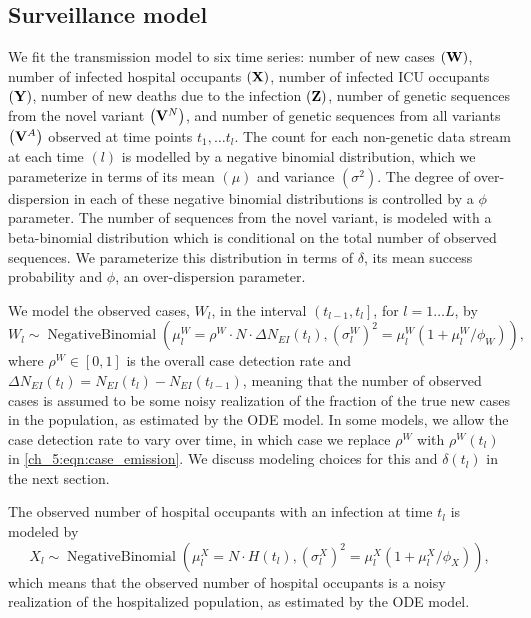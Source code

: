 \subsection{Surveillance model}
\label{ch_5:subsec:surveillance}

We fit the transmission model to six time series: number of new cases \( \left( \mathbf{W} \right) \),  number of infected hospital occupants \( \left( \mathbf{X} \right) \), number of infected ICU occupants \( \left( \mathbf{Y} \right) \), number of new deaths due to the infection \( \left( \mathbf{Z} \right) \), number of genetic sequences from the novel variant \( \left( \mathbf{V}^N \right) \), and number of genetic sequences from all variants \( \left( \mathbf{V}^A \right) \) observed at time points \( t_1, \ldots t_l \).
The count for each non-genetic data stream at each time \( \left( l \right) \) is modelled by a negative binomial distribution, which we parameterize in terms of its mean \( \left( \mu \right) \) and variance \( \left( \sigma^2 \right) \).
The degree of over-dispersion in each of these negative binomial distributions is controlled by a \( \phi \) parameter.
The number of sequences from the novel variant, is modeled with a beta-binomial distribution which is conditional on the total number of observed sequences.
We parameterize this distribution in terms of \( \delta \), its mean success probability and \( \phi \), an over-dispersion parameter.

We model the observed cases, \( W_l \), in the interval \( \left( t_{l - 1}, t_l \right] \), for \( l =1 \ldots L \), by
\begin{equation}
W_l \sim \operatorname{Negative Binomial} \left( \mu^{W}_l = \rho^W \cdot N \cdot \Delta N_{EI} \left( t_l \right), \left(\sigma^W_l\right)^{2} = \mu^{W}_l \left( 1 + \mu^{W}_l / \phi_W \right) \right),
\label{ch_5:eqn:case_emission}
\end{equation}
where \( \rho^W \in [0,1]\) is the overall case detection rate and \( \Delta N_{EI}(t_l) = N_{EI}(t_l) - N_{EI}(t_{l-1}) \), meaning that the number of observed cases is assumed to be some noisy realization of the fraction of the true new cases in the population, as estimated by the ODE model.
In some models, we allow the case detection rate to vary over time, in which case we replace \( \rho^W \) with \( \rho^W \left( t_l \right) \) in \eqref{ch_5:eqn:case_emission}.
We discuss modeling choices for this and \( \delta \left( t_l \right) \) in the next section.

The observed number of hospital occupants with an infection at time \( t_l \) is modeled by
\begin{equation}
X_l \sim \operatorname{Negative Binomial} \left( \mu^{X}_l = N \cdot H \left( t_l \right), \left(\sigma^X_l\right)^{2} = \mu^{X}_l \left( 1 + \mu^{X}_l / \phi_X \right) \right),
\label{ch_5:eqn:hosp_emission}
\end{equation}
which means that the observed number of hospital occupants is a noisy realization of the hospitalized population, as estimated by the ODE model.

